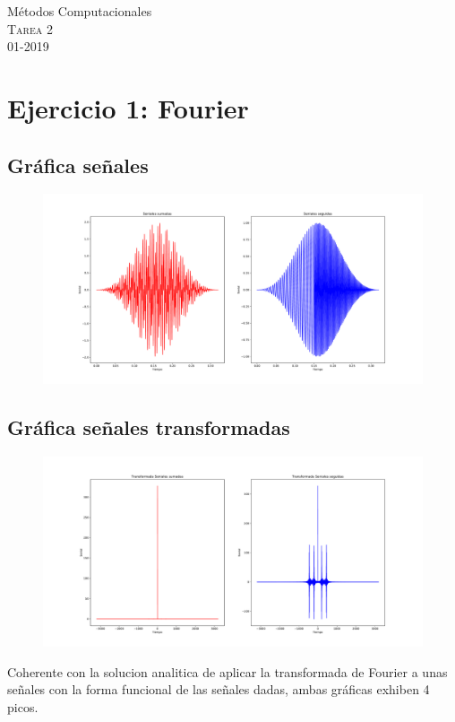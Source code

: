 \documentclass[11pt,letterpaper]{exam}
\begin{document}
\begin{center}
{\Large Métodos Computacionales} \\
\textsc{Tarea 2}\\
01-2019\\
\end{center}

\noindent
\section{Ejercicio 1: Fourier}
\subsection{Gráfica señales}
\begin{figure}[H]
\centering
\includegraphics[scale=0.35]{PlotFourier1.pdf}
\end{figure}

\subsection{Gráfica señales transformadas}
\begin{figure}[H]
\centering
\includegraphics[scale=0.35]{PlotTransFourier2.pdf}
\end{figure}
Coherente con la solucion analitica de aplicar la transformada de Fourier a unas señales con la forma funcional de las señales dadas, ambas gráficas exhiben 4 picos.  
\end{document}
